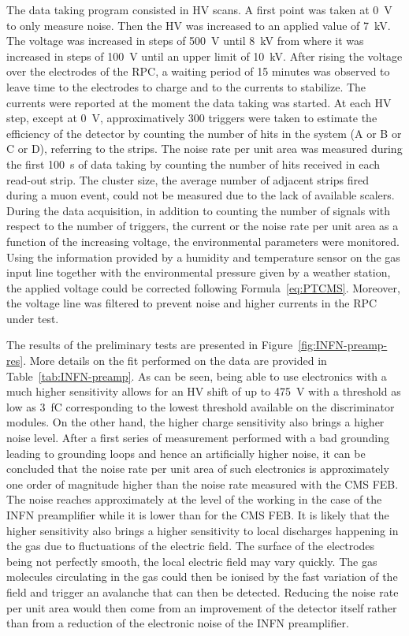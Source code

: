 	The data taking program consisted in \acl{HV} scans. A first point was taken at \SI{0}{V} to only measure noise. Then the HV was increased to an applied value of \SI{7}{kV}. The voltage was increased in steps of \SI{500}{V} until \SI{8}{kV} from where it was increased in steps of \SI{100}{V} until an upper limit of \SI{10}{kV}. After rising the voltage over the electrodes of the RPC, a waiting period of 15 minutes was observed to leave time to the electrodes to charge and to the currents to stabilize. The currents were reported at the moment the data taking was started. At each HV step, except at \SI{0}{V}, approximatively 300 triggers were taken to estimate the efficiency of the detector by counting the number of hits in the system (A or B or C or D), referring to the strips. The noise rate per unit area was measured during the first \SI{100}{s} of data taking by counting the number of hits received in each read-out strip. The cluster size, the average number of adjacent strips fired during a muon event, could not be measured due to the lack of available scalers.\\
	During the data acquisition, in addition to counting the number of signals with respect to the number of triggers, the current or the noise rate per unit area as a function of the increasing voltage, the environmental parameters were monitored. Using the information provided by a humidity and temperature sensor on the gas input line together with the environmental pressure given by a weather station, the applied voltage could be corrected following Formula~\ref{eq:PTCMS}. Moreover, the voltage line was filtered to prevent noise and higher currents in the RPC under test.
    
	The results of the preliminary tests are presented in Figure~\ref{fig:INFN-preamp-res}. More details on the fit performed on the data are provided in Table~\ref{tab:INFN-preamp}. As can be seen, being able to use electronics with a much higher sensitivity allows for an HV shift of up to \SI{475}{V} with a threshold as low as \SI{3}{fC} corresponding to the lowest threshold available on the discriminator modules. On the other hand, the higher charge sensitivity also brings a higher noise level. After a first series of measurement performed with a bad grounding leading to grounding loops and hence an artificially higher noise, it can be concluded that the noise rate per unit area of such electronics is approximately one order of magnitude higher than the noise rate measured with the CMS FEB. The noise reaches approximately  at the level of the working in the case of the INFN preamplifier while it is lower than  for the CMS FEB. It is likely that the higher sensitivity also brings a higher sensitivity to local discharges happening in the gas due to fluctuations of the electric field. The surface of the electrodes being not perfectly smooth, the local electric field may vary quickly. The gas molecules circulating in the gas could then be ionised by the fast variation of the field and trigger an avalanche that can then be detected. Reducing the noise rate per unit area would then come from an improvement of the detector itself rather than from a reduction of the electronic noise of the INFN preamplifier.
	
